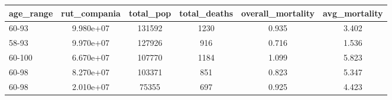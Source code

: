 \documentclass[]{article}
\begin{document}
\begin{tabular}{lccccc} \hline
age\_range & rut\_compania & total\_pop & total\_deaths & overall\_mortality & avg\_mortality \\ \hline
60-93 & 9.980e+07 & 131592 & 1230 & 0.935 & 3.402 \\
58-93 & 9.970e+07 & 127926 & 916 & 0.716 & 1.536 \\
60-100 & 6.670e+07 & 107770 & 1184 & 1.099 & 5.823 \\
60-98 & 8.270e+07 & 103371 & 851 & 0.823 & 5.347 \\
 60-98 & 2.010e+07 & 75355 & 697 & 0.925 & 4.423 \\ \hline
\end{tabular}
\end{document}
